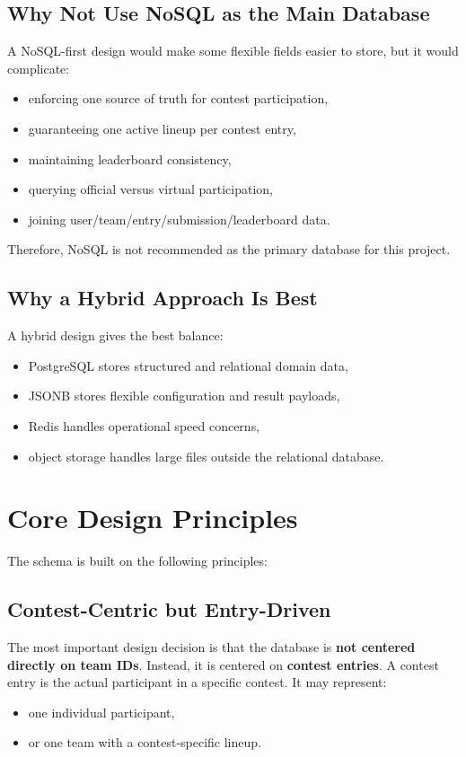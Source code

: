 \documentclass[11pt,a4paper]{article}
\begin{document}
\subsection{Why Not Use NoSQL as the Main Database}
A NoSQL-first design would make some flexible fields easier to store, but it would complicate:
\begin{itemize}
    \item enforcing one source of truth for contest participation,
    \item guaranteeing one active lineup per contest entry,
    \item maintaining leaderboard consistency,
    \item querying official versus virtual participation,
    \item joining user/team/entry/submission/leaderboard data.
\end{itemize}

Therefore, NoSQL is not recommended as the primary database for this project.

\subsection{Why a Hybrid Approach Is Best}
A hybrid design gives the best balance:
\begin{itemize}
    \item PostgreSQL stores structured and relational domain data,
    \item JSONB stores flexible configuration and result payloads,
    \item Redis handles operational speed concerns,
    \item object storage handles large files outside the relational database.
\end{itemize}

\section{Core Design Principles}
The schema is built on the following principles:

\subsection{Contest-Centric but Entry-Driven}
The most important design decision is that the database is \textbf{not centered directly on team IDs}. Instead, it is centered on \textbf{contest entries}. A contest entry is the actual participant in a specific contest. It may represent:
\begin{itemize}
    \item one individual participant,
    \item or one team with a contest-specific lineup.
\end{itemize}
\end{document}
